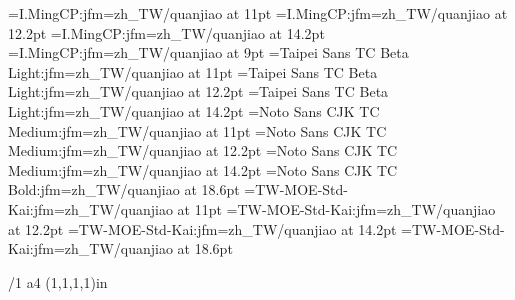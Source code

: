 
\jfont\ming={I.MingCP:jfm=zh_TW/quanjiao} at 11pt
\jfont\mingl={I.MingCP:jfm=zh_TW/quanjiao} at 12.2pt
\jfont\mingL={I.MingCP:jfm=zh_TW/quanjiao} at 14.2pt
\jfont\mings={I.MingCP:jfm=zh_TW/quanjiao} at 9pt
\jfont\hei={Taipei Sans TC Beta Light:jfm=zh_TW/quanjiao} at 11pt
\jfont\heil={Taipei Sans TC Beta Light:jfm=zh_TW/quanjiao} at 12.2pt
\jfont\heiL={Taipei Sans TC Beta Light:jfm=zh_TW/quanjiao} at 14.2pt
\jfont\heib={Noto Sans CJK TC Medium:jfm=zh_TW/quanjiao} at 11pt
\jfont\heibl={Noto Sans CJK TC Medium:jfm=zh_TW/quanjiao} at 12.2pt
\jfont\heibL={Noto Sans CJK TC Medium:jfm=zh_TW/quanjiao} at 14.2pt
\jfont\heibh={Noto Sans CJK TC Bold:jfm=zh_TW/quanjiao} at 18.6pt
\jfont\kai={TW-MOE-Std-Kai:jfm=zh_TW/quanjiao} at 11pt
\jfont\kail={TW-MOE-Std-Kai:jfm=zh_TW/quanjiao} at 12.2pt
\jfont\kaiL={TW-MOE-Std-Kai:jfm=zh_TW/quanjiao} at 14.2pt
\jfont\kaih={TW-MOE-Std-Kai:jfm=zh_TW/quanjiao} at 18.6pt



\margins/1 a4 (1,1,1,1)in  %
\typosize[11/18.4]

\ming
